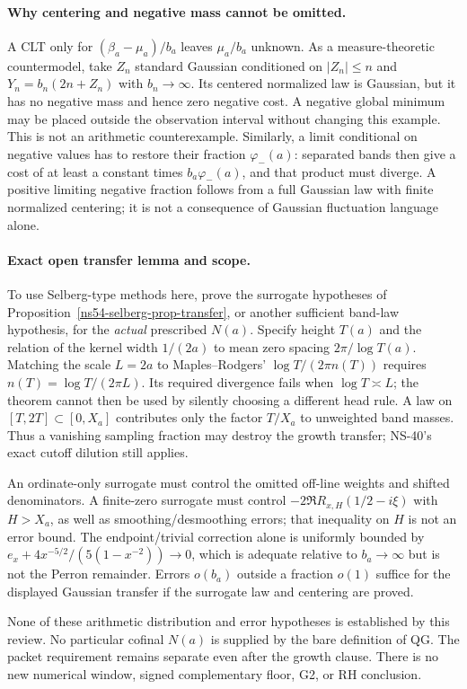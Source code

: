 \paragraph{Why centering and negative mass cannot be omitted.}
A CLT only for $(\beta_a-\mu_a)/b_a$ leaves $\mu_a/b_a$ unknown.
As a measure-theoretic countermodel, take $Z_n$ standard Gaussian
conditioned on $|Z_n|\le n$ and $Y_n=b_n(2n+Z_n)$ with
$b_n\to\infty$. Its centered normalized law is Gaussian, but it
has no negative mass and hence zero negative cost. A negative
global minimum may be placed outside the observation interval
without changing this example. This is not an arithmetic
counterexample. Similarly, a limit conditional on negative values
has to restore their fraction $\varphi_-(a)$: separated bands then
give a cost of at least a constant times $b_a\varphi_-(a)$, and
that product must diverge. A positive limiting negative fraction
follows from a full Gaussian law with finite normalized centering;
it is not a consequence of Gaussian fluctuation language alone.

\paragraph{Exact open transfer lemma and scope.}
To use Selberg-type methods here, prove the surrogate hypotheses of
Proposition~\ref{ns54-selberg-prop-transfer}, or another sufficient
band-law hypothesis, for the \emph{actual} prescribed $N(a)$.
Specify height $T(a)$ and the relation of the kernel width $1/(2a)$
to mean zero spacing $2\pi/\log T(a)$. Matching the scale
$L=2a$ to Maples--Rodgers' $\log T/(2\pi n(T))$ requires
$n(T)=\log T/(2\pi L)$. Its required divergence fails when
$\log T\asymp L$; the theorem cannot then be used by silently
choosing a different head rule. A law on $[T,2T]\subset[0,X_a]$
contributes only the factor $T/X_a$ to unweighted band masses.
Thus a vanishing sampling fraction may destroy the growth transfer;
NS-40's exact cutoff dilution still applies.

An ordinate-only surrogate must control the omitted off-line
weights and shifted denominators. A finite-zero surrogate must
control $-2\Re R_{x,H}(1/2-i\xi)$ with $H>X_a$, as well as
smoothing/desmoothing errors; that inequality on $H$ is not an
error bound. The endpoint/trivial correction alone is uniformly
bounded by $e_x+4x^{-5/2}/(5(1-x^{-2}))\to0$, which is adequate
relative to $b_a\to\infty$ but is not the Perron remainder.
Errors $o(b_a)$ outside a fraction $o(1)$ suffice for the displayed
Gaussian transfer if the surrogate law and centering are proved.

None of these arithmetic distribution and error hypotheses is
established by this review. No particular cofinal $N(a)$ is supplied
by the bare definition of QG. The packet requirement remains
separate even after the growth clause. There is no new numerical
window, signed complementary floor, G2, or RH conclusion.
